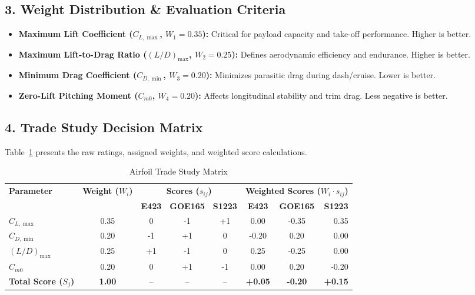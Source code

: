 \documentclass{article}
\begin{document}
\subsection*{3. Weight Distribution \& Evaluation Criteria}
\begin{itemize}
    \item \textbf{Maximum Lift Coefficient ($C_{L,\max}$, $W_1 = 0.35$):} Critical for payload capacity and take-off performance. Higher is better.
    \item \textbf{Maximum Lift-to-Drag Ratio ($(L/D)_{\max}$, $W_2 = 0.25$):} Defines aerodynamic efficiency and endurance. Higher is better.
    \item \textbf{Minimum Drag Coefficient ($C_{D,\min}$, $W_3 = 0.20$):} Minimizes parasitic drag during dash/cruise. Lower is better.
    \item \textbf{Zero-Lift Pitching Moment ($C_{m0}$, $W_4 = 0.20$):} Affects longitudinal stability and trim drag. Less negative is better.
\end{itemize}

\subsection*{4. Trade Study Decision Matrix}
Table~\ref{tab:trade_matrix} presents the raw ratings, assigned weights, and weighted score calculations.

\begin{table}[h!]
\centering
\caption{Airfoil Trade Study Matrix}
\label{tab:trade_matrix}
\begin{tabular}{lccccccr}
\toprule
\multirow{2}{*}{\textbf{Parameter}} & \multirow{2}{*}{\textbf{Weight ($W_i$)}} & \multicolumn{3}{c}{\textbf{Scores ($s_{ij}$)}} & \multicolumn{3}{c}{\textbf{Weighted Scores ($W_i \cdot s_{ij}$)}} \\
\cmidrule(lr){3-5} \cmidrule(lr){6-8}
& & \textbf{E423} & \textbf{GOE165} & \textbf{S1223} & \textbf{E423} & \textbf{GOE165} & \textbf{S1223} \\
\midrule
$C_{L,\max}$   & 0.35 & 0  & -1 & +1 & 0.00  & -0.35 & 0.35 \\
$C_{D,\min}$   & 0.20 & -1 & +1 & 0  & -0.20 & 0.20  & 0.00 \\
$(L/D)_{\max}$ & 0.25 & +1 & -1 & 0  & 0.25  & -0.25 & 0.00 \\
$C_{m0}$       & 0.20 & 0  & +1 & -1 & 0.00  & 0.20  & -0.20 \\
\midrule
\textbf{Total Score ($S_j$)} & \textbf{1.00} & -- & -- & -- & \textbf{+0.05} & \textbf{-0.20} & \textbf{+0.15} \\
\bottomrule
\end{tabular}
\end{table}
\end{document}
